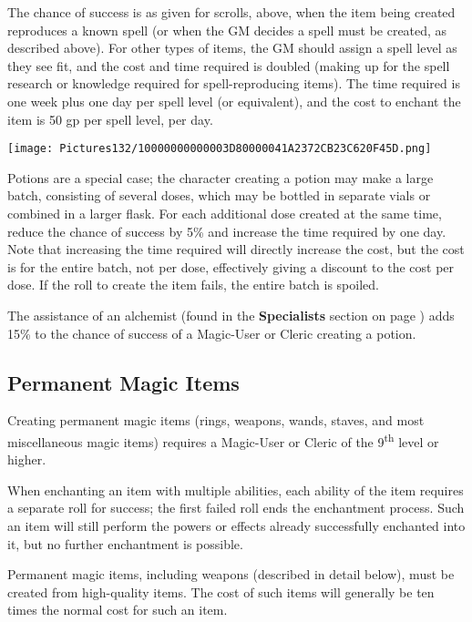\documentclass[a4paper,twoside,openany,10pt]{book}
\begin{document}
\begin{multicols}{2}
The chance of success is as given for scrolls, above, when the item being created reproduces a known spell (or when the GM decides a spell must be created, as described above). For other types of items, the GM should assign a spell level as they see fit, and the cost and time required is doubled (making up for the spell research or knowledge required for spell-reproducing items). The time required is one week plus one day per spell level (or equivalent), and the cost to enchant the item is 50 gp per spell level, per day.

\begin{center}
	\texttt{[image: Pictures132/10000000000003D80000041A2372CB23C620F45D.png]}
\end{center}

Potions are a special case; the character creating a potion may make a large batch, consisting of several doses, which may be bottled in separate vials or combined in a larger flask. For each additional dose created at the same time, reduce the chance of success by 5\% and increase the time required by one day. Note that increasing the time required will directly increase the cost, but the cost is for the entire batch, not per dose, effectively giving a discount to the cost per dose. If the roll to create the item fails, the entire batch is spoiled.

The assistance of an alchemist (found in the \textbf{Specialists} section on page \hyperlink{Alchemistux20Entry}{\pageref{Alchemistux20Entry}}) adds 15\% to the chance of success of a Magic-User or Cleric creating a potion.

\subsection{Permanent Magic Items}\label{permanent-magic-items}

Creating permanent magic items (rings, weapons, wands, staves, and most miscellaneous magic items) requires a Magic-User or Cleric of the 9\textsuperscript{th} level or higher.

When enchanting an item with multiple abilities, each ability of the item requires a separate roll for success; the first failed roll ends the enchantment process. Such an item will still perform the powers or effects already successfully enchanted into it, but no further enchantment is possible.

Permanent magic items, including weapons (described in detail below), must be created from high-quality items. The cost of such items will generally be ten times the normal cost for such an item.


\end{multicols}
\end{document}
